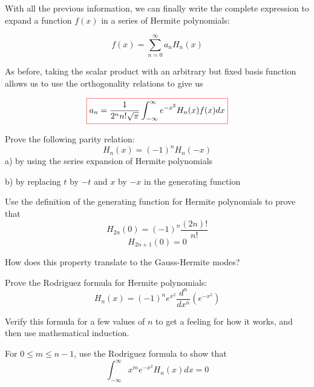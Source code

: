 
With all the previous information, we can finally write the complete expression to expand a function $f(x)$ in a series of Hermite polynomials:

\begin{equation}
f(x) = \sum_{n=0}^{\infty}a_n H_n(x)
\end{equation} 

As before, taking the scalar product with an arbitrary but fixed basis function allows us to use the orthogonality relations to give us

\begin{equation}
\fbox{$\displaystyle
a_n = \frac{1}{2^n n!\sqrt{\pi}} \int_{-\infty}^{\infty} e^{-x^2} H_n(x) f(x) dx
$}
\end{equation} 


\pagebreak
\begin{exer}
  
Prove the following parity relation:
$$H_n(x) = (-1)^nH_n(-x)$$
a) by using the series expansion of Hermite polynomials

b) by replacing $t$ by $-t$ and $x$ by $-x$ in the generating function
\end{exer}


\begin{exer}
Use the definition of the generating function for Hermite polynomials to prove that
$$H_{2n}(0) = (-1)^n \frac{(2n)!}{n!}$$
$$H_{2n+1}(0) = 0$$

How does this property translate to the Gauss-Hermite modes?

\end{exer}

\begin{exer}
Prove the Rodriguez formula for Hermite polynomials:
$$H_n(x) = (-1)^n e^{x^2}\frac{d^n}{d x^n}\left(e^{-x^2}\right)$$
\begin{hnt}
Verify this formula for a few values of $n$ to get a feeling for how it works, and then use mathematical induction.
\end{hnt}  
\end{exer}

\begin{exer}
For $0 \leq m \leq n-1$, use the Rodriguez formula to show that 
$$\int_{-\infty}^{\infty}x^m e^{-x^2} H_n(x) dx = 0$$
\end{exer}


